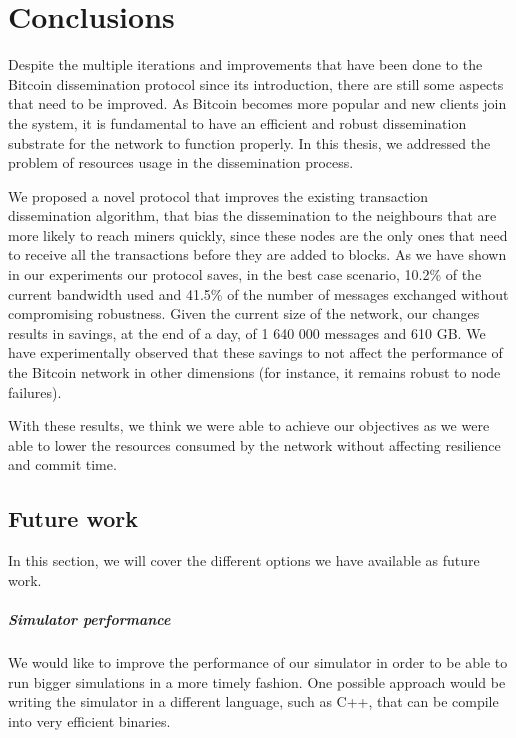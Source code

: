 \chapter{Conclusions}
\label{chap:conclusions}
Despite the multiple iterations and improvements  that have been done to the Bitcoin dissemination protocol since its introduction, there are still some aspects that need to be improved.
As Bitcoin becomes more popular and new clients join the system, it is fundamental to have an efficient and robust dissemination substrate for the network to function properly.
In this thesis, we addressed the problem of resources usage in the dissemination process.


We proposed a novel protocol that improves the existing transaction dissemination algorithm, that bias the dissemination to the neighbours that are more likely to reach miners quickly, since these nodes are the only ones that need to receive all the transactions before they are added to blocks. 
As we have shown in our experiments our protocol saves, in the best case scenario, 10.2\% of the current bandwidth used and 41.5\% of the number of messages exchanged without compromising robustness. Given the current size of the network, our changes results in savings, at the end of a day, of 1 640 000 messages and 610 GB. We have experimentally observed that these savings to not affect the performance of the Bitcoin network in other dimensions (for instance, it remains robust to node failures).

With these results, we think we were able to achieve our objectives as we were able to lower the resources consumed by the network without affecting resilience and commit time.

\section{Future work}

In this section, we will cover the different options we have available as future work.

\paragraph*{Simulator performance} We would like to improve the performance of our simulator in order to be able to run bigger simulations in a more timely fashion. One possible approach would be writing the simulator in a different language, such as C++, that can be compile into very efficient binaries.

